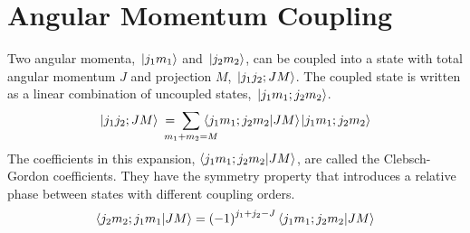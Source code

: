 \documentclass[thesis.tex]{subfiles}
\begin{document}
\chapter{Angular Momentum Coupling}
Two angular momenta, $\hspace{1pt}| j_{1}m_{1} \rangle$ and $\hspace{1pt}| j_{2}m_{2} \rangle$, can be coupled into a state with total angular momentum $J$ and projection $M$, $\hspace{1pt}| j_{1}j_{2};JM \rangle$. The coupled state is written as a linear combination of uncoupled states, $\hspace{1pt}| j_{1}m_{1};j_{2}m_{2} \rangle$.
\begin{equation}
\ket{j_{1}j_{2};JM}\hspace{1mm}=\hspace{-4mm}\sum_{m_{1}+m_{2}=M}\hspace{-4mm}\braket{j_{1}m_{1};j_{2}m_{2}}{JM}\ket{j_{1}m_{1};j_{2}m_{2}}
\end{equation}
The coefficients in this expansion, $\langle j_{1}m_{1};j_{2}m_{2} | JM\rangle$, are called the Clebsch-Gordon coefficients. They have the symmetry property that introduces a relative phase between states with different coupling orders.
\begin{equation}
\langle j_{2}m_{2};j_{1}m_{1} | JM\rangle=\left(-1\right)^{j_{1}+j_{2}-J}\langle j_{1}m_{1};j_{2}m_{2} | JM\rangle
\end{equation}
\end{document}
